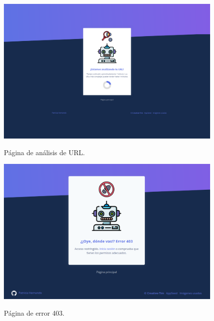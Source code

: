 \begin{figure}[h]
	\caption[Manual de usuario: página de carga]{Página de análisis de URL.}
	\centering
	\includegraphics[width=\textwidth]{../img/anexos/user_guide/2_analysis}
	\label{e-1:analysis}
\end{figure}

\begin{figure}[h]
	\caption[Manual de usuario: error 403]{Página de error 403.}
	\centering
	\includegraphics[width=\textwidth]{../img/anexos/user_guide/0_error_403}
	\label{e-0:error-403}
\end{figure}

